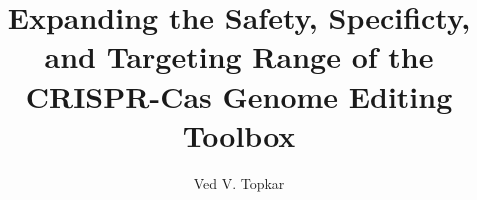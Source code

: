 \title{Expanding the Safety, Specificty, and Targeting Range of the CRISPR-Cas Genome Editing Toolbox}
\author{Ved V. Topkar}


%
